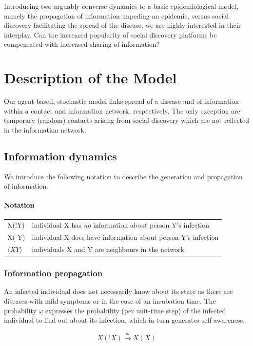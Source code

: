 \documentclass[11pt]{article}
\begin{document}
Introducing two arguably converse dynamics to a basic epidemiological model, namely the propagation of information impeding an epidemic, versus social discovery facilitating the spread of the disease, we are highly interested in their interplay.
Can the increased popularity of social discovery platforms be compensated with increased sharing of information?

\section{Description of the Model}

Our agent-based, stochastic model links spread of a disease and of information within a contact and information network, respectively.
The only exception are temporary (random) contacts arising from social discovery which are not reflected in the information network.

\subsection{Information dynamics}
We introduce the following notation to describe the generation and propagation of information.

\paragraph*{Notation}
\begin{tabular}{l l}
\hline
X(!Y) & individual X has {\it no} information about person Y's infection \\
X( Y) & individual X does have information about person Y's infection \\
$\langle XY \rangle$ & individuals X and Y are neighbours in the network \\
\hline
\end{tabular}

\subsubsection*{Information propagation}
An infected individual does not necessarily know about its state as there are diseases with mild symptoms or in the case of an incubation time.
The probability $\omega$ expresses the probability (per unit-time step) of the infected individual to find out about its infection, which in turn generates self-awareness.

\begin{equation}
X( !X)\xrightarrow\omega X( X)
\label{eq:omega}
\end{equation}
\end{document}
